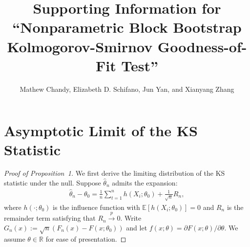 \documentclass[12pt]{article}
\title{Supporting Information for
  ``Nonparametric Block Bootstrap Kolmogorov-Smirnov Goodness-of-Fit
  Test''}
\author{Mathew Chandy, Elizabeth D. Schifano, Jun Yan, and Xianyang
  Zhang}
\begin{document}
\maketitle


\section{Asymptotic Limit of the KS Statistic}

\begin{proof}[Proof of Proposition~1]
We first derive the limiting distribution of the KS statistic under the null. 
Suppose $\hat{\theta}_n$ admits the expansion:
\begin{align}\label{eq-expan}
\hat{\theta}_n-\theta_0 = \frac{1}{n}\sum^{n}_{t=1}h(X_i;\theta_0) + 
\frac{1}{\sqrt{n}}R_n,    
\end{align}
where $h(\cdot;\theta_0)$ is the influence function with 
$\mathbb{E}[h(X_i;\theta_0)]=0$ and $R_n$ is the remainder term satisfying that
$R_n\overset{p}{\rightarrow} 0.$ Write $G_n(x):=\sqrt{n}(F_n(x) - 
F(x; \theta_0))$ 
and let $f(x;\theta)=\partial F(x;\theta)/\partial \theta$. We assume 
$\theta \in \mathbb{R}$ for ease of presentation.



\end{proof}
\end{document}
